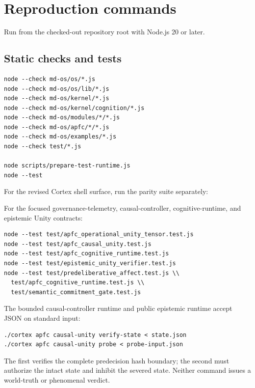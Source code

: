 \documentclass[10pt,twocolumn]{article}
\theoremstyle{definition}
\theoremstyle{plain}
\theoremstyle{remark}
\begin{document}
\appendix

\section{Reproduction commands}
\label{app:commands}

Run from the checked-out repository root with Node.js 20 or later.

\subsection{Static checks and tests}

\begin{lstlisting}
node --check md-os/os/*.js
node --check md-os/os/lib/*.js
node --check md-os/kernel/*.js
node --check md-os/kernel/cognition/*.js
node --check md-os/modules/*/*.js
node --check md-os/apfc/*/*.js
node --check md-os/examples/*.js
node --check test/*.js

node scripts/prepare-test-runtime.js
node --test
\end{lstlisting}

For the revised Cortex shell surface, run the parity suite separately:


For the focused governance-telemetry, causal-controller, cognitive-runtime, and epistemic Unity contracts:

\begin{lstlisting}
node --test test/apfc_operational_unity_tensor.test.js
node --test test/apfc_causal_unity.test.js
node --test test/apfc_cognitive_runtime.test.js
node --test test/epistemic_unity_verifier.test.js
node --test test/predeliberative_affect.test.js \\
  test/apfc_cognitive_runtime.test.js \\
  test/semantic_commitment_gate.test.js
\end{lstlisting}

The bounded causal-controller runtime and public epistemic runtime accept JSON on standard input:

\begin{lstlisting}
./cortex apfc causal-unity verify-state < state.json
./cortex apfc causal-unity probe < probe-input.json
\end{lstlisting}

The first verifies the complete predecision hash boundary; the second must authorize the intact state and inhibit the severed state.  Neither command issues a world-truth or phenomenal verdict.
\end{document}
